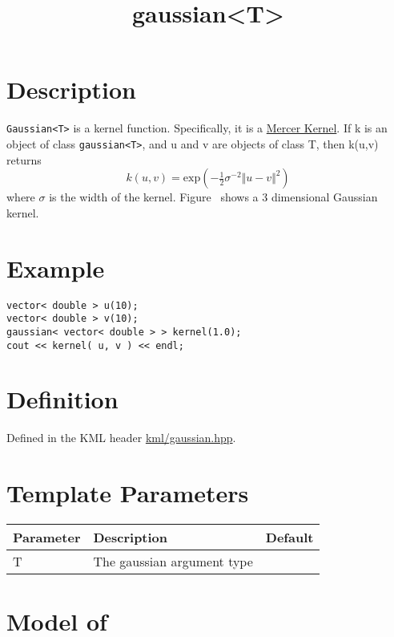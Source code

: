 \documentclass{article}
\newcommand{\half}{\tfrac{1}{2}}
\begin{document}
\title{gaussian<T>}
\maketitle

\section*{Description}

\texttt{Gaussian<T>} is a kernel function. Specifically, it is a \href{\kmlroot/mercer_kernel.html}{Mercer Kernel}. If k is an object of class \texttt{gaussian<T>}, and u and v are objects of class T, then k(u,v) returns
%
$$k(u,v) = \textrm{exp}( - \half \sigma^{-2} \Vert u-v \Vert^2 ) $$
%
where $\sigma$ is the width of the kernel. Figure~ shows a 3 dimensional Gaussian kernel. 

\begin{figure}
\end{figure}



\section*{Example}


\highlightcpp{}
\begin{verbatim}
vector< double > u(10);
vector< double > v(10);
gaussian< vector< double > > kernel(1.0);
cout << kernel( u, v ) << endl;
\end{verbatim}


\section*{Definition}

Defined in the KML header \href{\kmlsvnroot/kml/gaussian.hpp}{kml/gaussian.hpp}.


\section*{Template Parameters}

\begin{tabular}{lll}
\textbf{Parameter} & \textbf{Description} & \textbf{Default} \\ 
\hline
T & The gaussian argument type \\ 
\end{tabular}


\section*{Model of}
\end{document}
